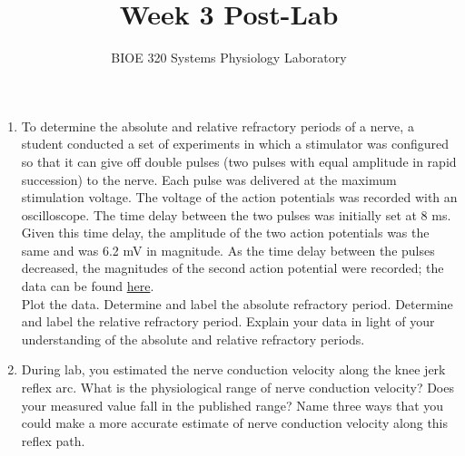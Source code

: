 \documentclass{article}
\title{Week 3 Post-Lab}
\author{BIOE 320 Systems Physiology Laboratory}
\date{}
\begin{document}
\maketitle
\large

\begin{enumerate}
	\item To determine the absolute and relative refractory periods of a nerve, a student conducted a set of experiments in which a stimulator was configured so that it can give off double pulses (two pulses with equal amplitude in rapid succession) to the nerve. Each pulse was delivered at the maximum stimulation voltage. The voltage of the action potentials was recorded with an oscilloscope. The time delay between the two pulses was initially set at 8 ms. Given this time delay, the amplitude of the two action potentials was the same and was 6.2 mV in magnitude. As the time delay between the pulses decreased, the magnitudes of the second action potential were recorded; the data can be found \href{https://jameslong12.github.io/BIOE320/Assignments.html}{here}.\\
	
	
	Plot the data. Determine and label the absolute refractory period. Determine and label the relative refractory period. Explain your data in light of your understanding of the absolute and relative refractory periods.
	\item During lab, you estimated the nerve conduction velocity along the knee jerk reflex arc. What is the physiological range of nerve conduction velocity? Does your measured value fall in the published range? Name three ways that you could make a more accurate estimate of nerve conduction velocity along this reflex path.
\end{enumerate}
\end{document}
